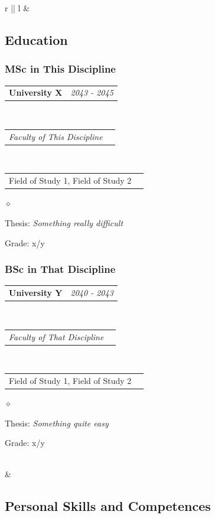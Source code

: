 \documentclass[a4paper]{article}
\makeatletter
\newlength{\sectsep}
\newcommand{\headerrow}[2]
{\begin{tabular*}{\textwidth}{l@{\extracolsep{\fill}}r}
	#1 &
	#2 \\
\end{tabular*}}
\renewenvironment{itemize}{
  \begin{list}{$\diamond$}{
    \setlength{\topsep}{0.25em}
    \setlength{\itemsep}{0em}
    \setlength{\parskip}{0pt}
    \setlength{\parsep}{0em}
  }
}{
  \end{list}
}
\makeatother
\begin{document}
\begin{longtable}{r || l}
  & \begin{minipage}{0.9\textwidth}
      \vspace{\sectsep}
      \subsection*{Education}
      \subsubsection*{MSc in This Discipline}
      \headerrow
  		{\textbf{University X}}{\emph{2043 - 2045}}
      \\
      \headerrow
        {\emph{Faculty of This Discipline}}{}
      \\
      \headerrow
        {Field of Study 1, Field of Study 2}{}

      \begin{itemize}
          \item Thesis: \emph{Something really difficult}
          \item Grade: x/y
      \end{itemize}

      \subsubsection*{BSc in That Discipline}
      \headerrow
  		{\textbf{University Y}}{\emph{2040 - 2043}}
      \\
      \headerrow
        {\emph{Faculty of That Discipline}}{}
      \\
      \headerrow
        {Field of Study 1, Field of Study 2}{}

      \begin{itemize}
          \item Thesis: \emph{Something quite easy}
          \item Grade: x/y
      \end{itemize}
      \vfill
  \end{minipage} \\

  & \begin{minipage}{0.9\textwidth}
      \vspace{0.2\sectsep}
      \subsection*{Personal Skills and Competences}

\end{minipage}
\end{longtable}
\end{document}
